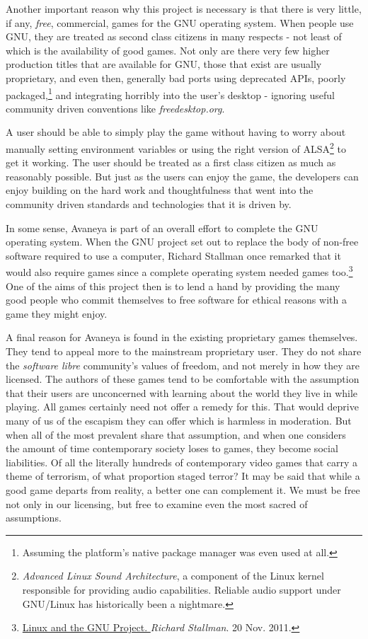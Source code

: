 Another important reason why this project is necessary is that there is very little, if any, {\it free}, commercial, games for the GNU operating system. When people use GNU, they are treated as second class citizens in many respects - not least of which is the availability of good games. Not only are there very few higher production titles that are available for GNU, those that exist are usually proprietary, and even then, generally bad ports using deprecated APIs, poorly packaged,\footnote{Assuming the platform's native package manager was even used at all.} and integrating horribly into the user's desktop - ignoring  useful community driven conventions like {\it freedesktop.org}. 

A user should be able to simply play the game without having to worry about manually setting environment variables or using the right version of ALSA\footnote{{\it Advanced Linux Sound Architecture}, a component of the Linux kernel responsible for providing audio capabilities. Reliable audio support under GNU/Linux has historically been a nightmare.} to get it working. The user should be treated as a first class citizen as much as reasonably possible. But just as the users can enjoy the game, the developers can enjoy building on the hard work and thoughtfulness that went into the community driven standards and technologies that it is driven by.

In some sense, Avaneya is part of an overall effort to complete the GNU operating system. When the GNU project set out to replace the body of non-free software required to use a computer, Richard Stallman once remarked that it would also require games since a complete operating system needed games too.\footnote{\href{http://www.gnu.org/gnu/linux-and-gnu.html}{Linux and the GNU Project. }{\it Richard Stallman}. 20 Nov. 2011.} One of the aims of this project then is to lend a hand by providing the many good people who commit themselves to free software for ethical reasons with a game they might enjoy.

A final reason for Avaneya is found in the existing proprietary games themselves. They tend to appeal more to the mainstream proprietary user. They do not share the {\it software libre} community's values of freedom, and not merely in how they are licensed. The authors of these games tend to be comfortable with the assumption that their users are unconcerned with learning about the world they live in while playing. All games certainly need not offer a remedy for this. That would deprive many of us of the escapism they can offer which is harmless in moderation. But when all of the most prevalent share that assumption, and when one considers the amount of time contemporary society loses to games, they become social liabilities. Of all the literally hundreds of contemporary video games that carry a theme of terrorism, of what proportion staged terror? It may be said that while a good game departs from reality, a better one can complement it. We must be free not only in our licensing, but free to examine even the most sacred of assumptions.

